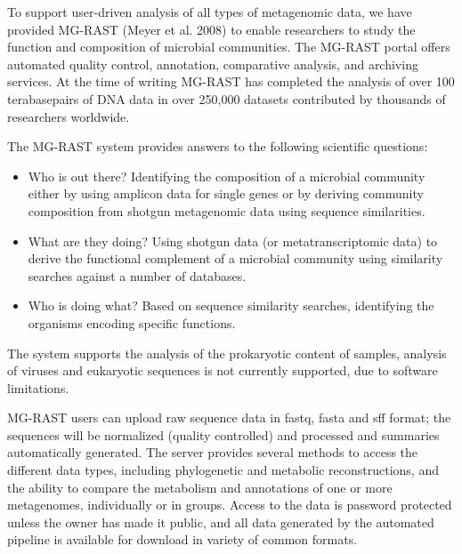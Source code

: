 \documentclass[letterpaper,10pt,english]{sphinxmanual}
\begin{document}
\begin{DUlineblock}{0em}
\item[] To support user-driven analysis of all types of metagenomic data, we
have provided MG-RAST (Meyer et al. 2008) to enable researchers to
study the function and composition of microbial communities. The
MG-RAST portal offers automated quality control, annotation,
comparative analysis, and archiving services. At the time of writing
MG-RAST has completed the analysis of over 100 terabasepairs of DNA
data in over 250,000 datasets contributed by thousands of researchers
worldwide.
\item[] The MG-RAST system provides answers to the following scientific
questions:
\end{DUlineblock}
\begin{itemize}
\item {} 
Who is out there? Identifying the composition of a microbial
community either by using amplicon data for single genes or by
deriving community composition from shotgun metagenomic data using
sequence similarities.

\item {} 
What are they doing? Using shotgun data (or metatranscriptomic data)
to derive the functional complement of a microbial community using
similarity searches against a number of databases.

\item {} 
Who is doing what? Based on sequence similarity searches, identifying
the organisms encoding specific functions.

\end{itemize}

The system supports the analysis of the prokaryotic content of samples,
analysis of viruses and eukaryotic sequences is not currently supported,
due to software limitations.

MG-RAST users can upload raw sequence data in fastq, fasta and sff
format; the sequences will be normalized (quality controlled) and
processed and summaries automatically generated. The server provides
several methods to access the different data types, including
phylogenetic and metabolic reconstructions, and the ability to compare
the metabolism and annotations of one or more metagenomes, individually
or in groups. Access to the data is password protected unless the owner
has made it public, and all data generated by the automated pipeline is
available for download in variety of common formats.
\end{document}
